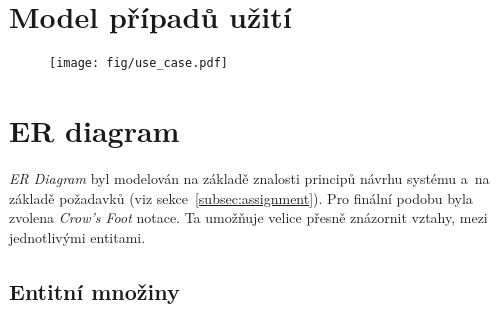 \documentclass[a4paper]{article}
\begin{document}
  \section{Model případů užití}
  \label{sec:use-case}

    \begin{figure}[H]
      \texttt{[image: fig/use\_case.pdf]}
    \end{figure}

  \newpage

  \section{ER diagram}
  \label{sec:er}

    \emph{ER Diagram} byl modelován na základě znalosti principů návrhu systému a~na základě požadavků (viz sekce~\ref{subsec:assignment}). Pro finální podobu byla zvolena \emph{Crow's Foot} notace. Ta umožňuje velice přesně znázornit vztahy, mezi jednotlivými entitami.
    
    \subsection{Entitní množiny}
    \label{subsec:entity}
\end{document}
